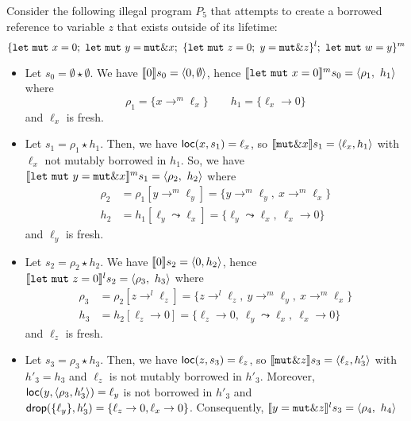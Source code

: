 \begin{example}
  Consider the following illegal program $P_5$ that attempts to create
  a borrowed reference to variable $z$ that exists outside of its lifetime:
  {\small
  \[
    \{
      \mathtt{let\ mut}\ x = 0;\
      \mathtt{let\ mut}\ y = \mathtt{mut}\borrow x;\
      \{\mathtt{let\ mut}\ z = 0;\ y = \mathtt{mut}\borrow z\}^l;\
      \mathtt{let\ mut}\ w = y
    \}^m
  \]}
  \begin{itemize}
    \item Let $s_0=\emptyset \star \emptyset$.
    We have $\den[0]{s_0} = \langle 0,\emptyset\rangle$, hence
    $\denl[\mathtt{let\ mut}\ x = 0]{m}{s_0} =
    \langle \rho_1,\ h_1\rangle$ where
    \[\rho_1=\{x\to^m\ell_x\} \qquad
    h_1 = \{\ell_x\to 0\}\]
    and $\ell_x$ is fresh.
    \item Let $s_1 = \rho_1 \star h_1$.
    Then, we have $\loc(x,s_1) = \ell_x$, so
    $\den[\mathtt{mut}\borrow x]{s_1} = \langle\ell_x, h_1\rangle$
    with $\ell_x$ not mutably borrowed in $h_1$.
    So, we have
    $\denl[\mathtt{let\ mut}\ y = \mathtt{mut}\borrow x]{m}{s_1} =
    \langle \rho_2,\ h_2\rangle$
    where
    \begin{align*}
      \rho_2 & = \rho_1[y\to^m\ell_y] = \{y\to^m\ell_y,\ x\to^m\ell_x\}\\
      h_2 & = h_1[\ell_y\leadsto \ell_x] =
      \{\ell_y\leadsto \ell_x,\ \ell_x\to 0\}
    \end{align*}
    and $\ell_y$ is fresh.
    \item Let $s_2 = \rho_2 \star h_2$.
    We have $\den[0]{s_2} = \langle 0,h_2\rangle$, hence
    $\denl[\mathtt{let\ mut}\ z = 0]{l}{s_2} =
    \langle \rho_3,\ h_3\rangle$ where
    \begin{align*}
      \rho_3 & = \rho_2[z\to^l\ell_z] =
      \{z\to^l\ell_z,\ y\to^m\ell_y,\ x\to^m\ell_x\}\\
      h_3 & = h_2[\ell_z\to 0] =
      \{\ell_z\to 0,\ \ell_y\leadsto \ell_x,\ \ell_x\to 0\}
    \end{align*}
    and $\ell_z$ is fresh.
    \item Let $s_3 = \rho_3 \star h_3$.
    Then, we have $\loc(z,s_3) = \ell_z$, so
    $\den[\mathtt{mut}\borrow z]{s_3} = \langle\ell_z, h'_3\rangle$
    with $h'_3=h_3$ and $\ell_z$ is not mutably borrowed in $h'_3$.
    Moreover, $\loc(y,\langle \rho_3,h'_3\rangle) = \ell_y$ is not
    borrowed in $h'_3$
    and $\drop(\{\ell_y\},h'_3) =
    \{\ell_z\to 0,\ell_x\to 0\}$. Consequently,
    $\denl[y = \mathtt{mut}\borrow z]{l}{s_3} = \langle \rho_4,\ h_4\rangle$

\end{itemize}
\end{example}
